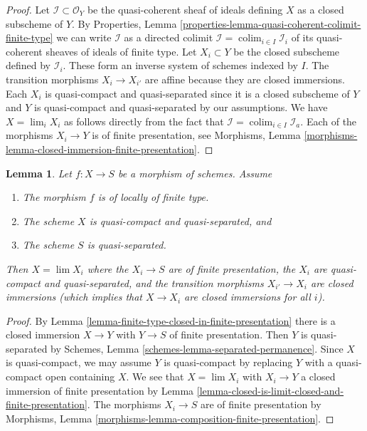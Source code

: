 \documentclass{stacks-project}
\theoremstyle{plain}
\newtheorem{lemma}[subsection]{Lemma}
\theoremstyle{definition}
\theoremstyle{remark}
\numberwithin{equation}{subsection}
\def\lim{\mathop{\mathrm{lim}}\nolimits}
\def\colim{\mathop{\mathrm{colim}}\nolimits}
\begin{document}
\begin{proof}
Let $\mathcal{I} \subset \mathcal{O}_Y$ be the quasi-coherent sheaf of
ideals defining $X$ as a closed subscheme of $Y$. By
Properties, Lemma \ref{properties-lemma-quasi-coherent-colimit-finite-type}
we can write $\mathcal{I}$ as a directed colimit
$\mathcal{I} = \colim_{i \in I} \mathcal{I}_i$ of its
quasi-coherent sheaves of ideals of finite type.
Let $X_i \subset Y$ be the closed subscheme defined by $\mathcal{I}_i$.
These form an inverse system of schemes indexed by $I$.
The transition morphisms $X_i \to X_{i'}$ are affine because
they are closed immersions. Each $X_i$ is quasi-compact and quasi-separated
since it is a closed subscheme of $Y$ and $Y$ is quasi-compact and
quasi-separated by our assumptions.
We have $X = \lim_i X_i$ as follows directly from the
fact that $\mathcal{I} = \colim_{i \in I} \mathcal{I}_a$.
Each of the morphisms $X_i \to Y$ is of finite presentation, see
Morphisms, Lemma \ref{morphisms-lemma-closed-immersion-finite-presentation}.
\end{proof}

\begin{lemma}
\label{lemma-finite-type-is-limit-finite-presentation}
Let $f : X \to S$ be a morphism of schemes. Assume
\begin{enumerate}
\item The morphism $f$ is of locally of finite type.
\item The scheme $X$ is quasi-compact and quasi-separated, and
\item The scheme $S$ is quasi-separated.
\end{enumerate}
Then $X = \lim X_i$ where the $X_i \to S$ are of
finite presentation, the $X_i$ are quasi-compact and quasi-separated,
and the transition morphisms $X_{i'} \to X_i$ are closed immersions
(which implies that $X \to X_i$ are closed immersions for all $i$).
\end{lemma}

\begin{proof}
By Lemma \ref{lemma-finite-type-closed-in-finite-presentation}
there is a closed immersion $X \to Y$ with $Y \to S$ of
finite presentation. Then $Y$ is quasi-separated by
Schemes, Lemma \ref{schemes-lemma-separated-permanence}.
Since $X$ is quasi-compact, we may assume
$Y$ is quasi-compact by replacing $Y$ with a quasi-compact open
containing $X$. We see that $X = \lim X_i$ with $X_i \to Y$ a closed
immersion of finite presentation by
Lemma \ref{lemma-closed-is-limit-closed-and-finite-presentation}.
The morphisms $X_i \to S$ are of finite presentation by
Morphisms, Lemma \ref{morphisms-lemma-composition-finite-presentation}.
\end{proof}
\end{document}
